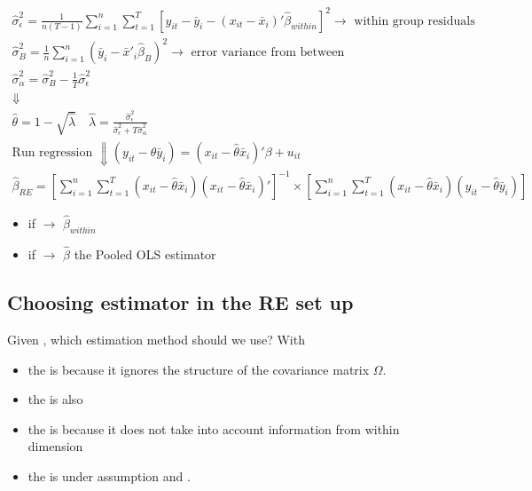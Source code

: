 \begin{gather*}
    \hat{\sigma}^2_{\epsilon} = \frac{1}{n(T-1)}\sum_{i=1}^{n}\sum_{t=1}^{T}\left[y_{it}-\bar{y}_i-(x_{it}-\bar{x}_i)'\hat{\beta}_{within}\right]^2\to\text{ within group residuals}\\
    \hat{\sigma}^2_B = \frac{1}{n}\sum_{i=1}^{n}(\bar{y}_i-\bar{x}'_i\hat{\beta}_B)^2\to\text{ error variance from between}\\
    \hat{\sigma}^2_{\alpha} = \hat{\sigma}^2_{B} - \frac{1}{T}\hat{\sigma}^2_{\epsilon}\\
    \Downarrow\\
    \hat{\theta} = 1 - \sqrt{\hat{\lambda}}\quad \hat{\lambda} = \frac{\hat{\sigma}^2_{\epsilon}}{\hat{\sigma}^2_{\epsilon}+T\hat{\sigma}^2_{\alpha}}\\
    \text{Run regression }\Downarrow (y_{it} - \hat{\theta} \bar{y}_i) = (x_{it}-\hat{\theta}\bar{x}_i)'\beta + u_{it}\\
    \hat{\beta}_{RE} = \left[\sum_{i=1}^{n}\sum_{t=1}^{T}(x_{it}-\hat{\theta}\bar{x}_i)(x_{it}-\hat{\theta}\bar{x}_i)'\right]^{-1}\times \left[\sum_{i=1}^{n}\sum_{t=1}^{T}(x_{it}-\hat{\theta}\bar{x}_i)(y_{it}-\hat{\theta}\bar{y}_i)\right]
\end{gather*}
\begin{itemize}
    \item if  $\to$ $\hat{\beta}_{within}$
    \item if  $\to$ $\hat{\beta}$ the Pooled OLS estimator
\end{itemize}

\subsection{Choosing estimator in the RE set up}

Given , which estimation method should we use? With 
\begin{itemize}
    \item the  is  because it ignores the structure of the covariance matrix $\Omega$.
    \item the  is also 
    \item the  is  because it does not take into account information from within dimension
    \item the  is  under  assumption and .
\end{itemize}
\\


